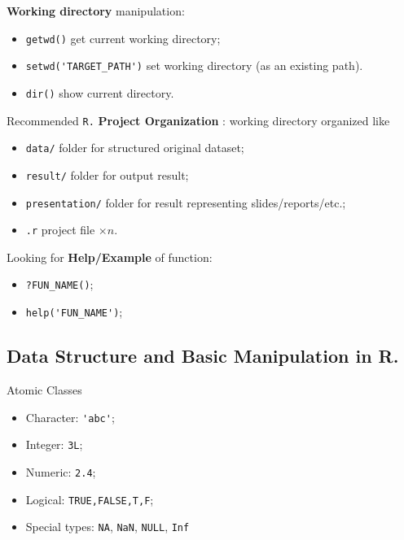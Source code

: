 \begin{point}
    \textbf{Working directory}  manipulation:
\end{point}

\begin{itemize}[topsep=2pt,itemsep=0pt]
    \item \lstinline|getwd()| get current working directory;
    \item \lstinline|setwd('TARGET_PATH')| set working directory (as an existing path).
    \item \lstinline|dir()| show current directory.
\end{itemize}

\begin{point}
    Recommended \lstinline|R.| \textbf{Project Organization} : working directory organized like
\end{point}

\begin{itemize}[topsep=2pt,itemsep=0pt]
    \item \lstinline|data/| folder for structured original dataset;
    \item \lstinline|result/| folder for output result;
    \item \lstinline|presentation/| folder for result representing slides/reports/etc.;
    \item \lstinline|.r| project file $ \times n $.
\end{itemize}

\begin{point}
    Looking for \textbf{Help/Example}  of function:
\end{point}

\begin{itemize}[topsep=2pt,itemsep=0pt]
    \item \lstinline|?FUN_NAME()|;
    \item \lstinline|help('FUN_NAME')|;
\end{itemize}

\subsection{Data Structure and Basic Manipulation in R.}

\begin{point}
    Atomic Classes
\end{point}
\begin{itemize}[topsep=2pt,itemsep=0pt]
    \item Character: \lstinline|'abc'|;
    \item Integer: \lstinline|3L|;
    \item Numeric: \lstinline|2.4|;
    \item Logical: \lstinline|TRUE,FALSE,T,F|;
    \item Special types: \lstinline|NA|, \lstinline|NaN|, \lstinline|NULL|, \lstinline|Inf|
\end{itemize}

